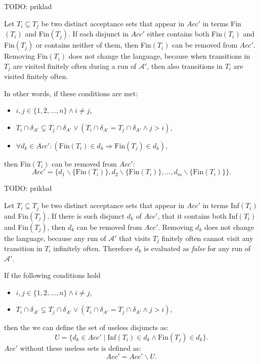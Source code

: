 \documentclass[
  digital, %
  twoside, %
  table,   %
  lof,     %
  lot,     %
]{fithesis3}
\begin{document}
TODO: priklad

Let $T_i \subseteq T_j$ be two distinct acceptance sets that appear in $Acc'$ in terms Fin$(T_i)$ and Fin$(T_j)$. If each disjunct in $Acc'$ either contains both Fin$(T_i)$ and Fin$(T_j)$ or contains neither of them, then Fin$(T_i)$ can be removed from $Acc'$.  Removing Fin$(T_i)$ does not change the language, because when transitions in $T_j$ are visited finitely often during a run of $\mathcal{A'}$, then also transitions in $T_i$ are visited finitely often. 

In other words, if these conditions are met:
\begin{itemize}
  \item $i, j \in \{1,2, \dots, n\} \wedge i \neq j$,
  \item $T_i \cap \delta_{A'} \subsetneq T_j \cap \delta_{A'} \vee (T_i \cap \delta_{A'} = T_j \cap \delta_{A'} \wedge j > i)$,
  \item $\forall d_k \in Acc' \colon (\text{Fin}(T_i) \in d_k \Rightarrow \text{Fin}(T_j) \in d_k)$,
\end{itemize}
then Fin$(T_i)$ can be removed from $Acc'$:
\begin{equation*}
  Acc' = \{d_1 \smallsetminus \{\text{Fin}(T_i)\}, d_2 \smallsetminus \{\text{Fin}(T_i)\}, \dots, d_m \smallsetminus \{\text{Fin}(T_i)\}\}.
\end{equation*}

TODO: priklad

Let $T_i \subseteq T_j$ be two distinct acceptance sets that appear in $Acc'$ in terms Inf$(T_i)$ and Fin$(T_j)$. If there is such disjunct $d_k$ of $Acc'$, that it contains both Inf$(T_i)$ and Fin$(T_j)$, then $d_k$ can be removed from $Acc'$. Removing $d_k$ does not change the language, because any run of $\mathcal{A'}$ that visits $T_j$ finitely often cannot visit any transition in $T_i$ infinitely often. Therefore $d_k$ is evaluated as \emph{false} for any run of $\mathcal{A'}$. 

If the following conditions hold
\begin{itemize}
  \item $i, j \in \{1, 2, \dots, n\} \wedge i \neq j$,
  \item $T_i \cap \delta_{A'} \subsetneq T_j \cap \delta_{A'} \vee (T_i \cap \delta_{A'} = T_j \cap \delta_{A'} \wedge j > i)$,
\end{itemize}
then the we can define the set of useless disjuncts as:
\begin{equation*}
  U = \{d_k \in Acc' \mid \text{Inf}(T_i) \in d_k \wedge \text{Fin}(T_j) \in d_k \}.
\end{equation*}
$Acc'$ without these useless sets is defined as:
\begin{equation*}
  Acc' = Acc' \smallsetminus U.
\end{equation*}
\end{document}
